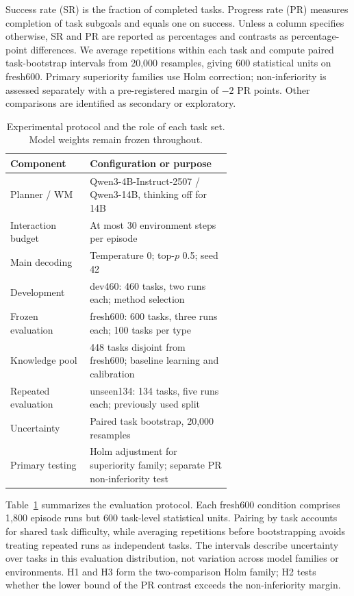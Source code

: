 \documentclass[runningheads]{llncs}
\begin{document}
Success rate (SR) is the fraction of completed tasks. Progress rate (PR) measures completion of task subgoals and equals one on success. Unless a column specifies otherwise, SR and PR are reported as percentages and contrasts as percentage-point differences. We average repetitions within each task and compute paired task-bootstrap intervals from 20,000 resamples, giving 600 statistical units on fresh600. Primary superiority families use Holm correction; non-inferiority is assessed separately with a pre-registered margin of $-2$ PR points. Other comparisons are identified as secondary or exploratory.

\begin{table}[tbp]
\caption{Experimental protocol and the role of each task set. Model weights remain frozen throughout.}
\label{tab:protocol}\centering
\begin{tabular}{lp{0.64\linewidth}}\toprule
Component & Configuration or purpose\\\midrule
Planner / WM & Qwen3-4B-Instruct-2507 / Qwen3-14B, thinking off for 14B\\
Interaction budget & At most 30 environment steps per episode\\
Main decoding & Temperature 0; top-$p$ 0.5; seed 42\\
Development & dev460: 460 tasks, two runs each; method selection\\
Frozen evaluation & fresh600: 600 tasks, three runs each; 100 tasks per type\\
Knowledge pool & 448 tasks disjoint from fresh600; baseline learning and calibration\\
Repeated evaluation & unseen134: 134 tasks, five runs each; previously used split\\
Uncertainty & Paired task bootstrap, 20,000 resamples\\
Primary testing & Holm adjustment for superiority family; separate PR non-inferiority test\\\bottomrule
\end{tabular}
\end{table}

Table~\ref{tab:protocol} summarizes the evaluation protocol. Each fresh600 condition comprises 1,800 episode runs but 600 task-level statistical units. Pairing by task accounts for shared task difficulty, while averaging repetitions before bootstrapping avoids treating repeated runs as independent tasks. The intervals describe uncertainty over tasks in this evaluation distribution, not variation across model families or environments. H1 and H3 form the two-comparison Holm family; H2 tests whether the lower bound of the PR contrast exceeds the non-inferiority margin.
\end{document}
